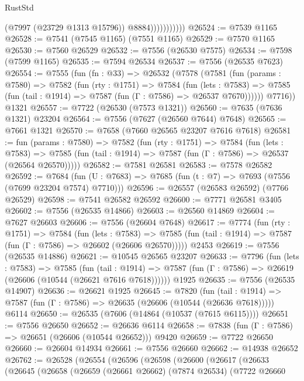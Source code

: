 \begin{lexlean}{RustStd}
\begin{coremodule}
{\begin{coremodule}
{{{{{{{{{{{{{{{{{{{{{{{{{{{{{{{{{{{{{{{{{{{                          (@7997 (@23729 @1313 @15796))
                          @8884)))))))))))
@26524 := @7539 @1165
@26528 := @7541 (@7545 @1165) (@7551 @1165)
@26529 := @7570 @1165
@26530 := @7560 @26529
@26532 := @7556 (@26530 @7575)
@26534 := @7598 (@7599 @1165)
@26535 := @7594 @26534
@26537 := @7556 (@26535 @7623)
@26554 := @7555
    (fun (fn : @33) =>
    @26532
      (@7578
        (@7581
          (fun (params : @7580) =>
          @7582
            (fun (rty : @1751) =>
            @7584
              (fun (lets : @7583) =>
              @7585 (fun (tail : @1914) => @7587 (fun (Γ : @7586) => @26537 @7670))))))
        @7716))
    @1321
@26557 := @7722 (@26530 (@7573 @1321))
@26560 := @7635 (@7636 @1321) @23204
@26564 := @7556 (@7627 (@26560 @7644) @7648)
@26565 := @7661 @1321
@26570 := @7658 (@7660 @26565 @23207 @7616 @7618)
@26581 := fun (params : @7580) =>
  @7582
    (fun (rty : @1751) =>
    @7584
      (fun (lets : @7583) =>
      @7585 (fun (tail : @1914) => @7587 (fun (Γ : @7586) => @26537 (@26564 @26570)))))
@26582 := @7581 @26581
@26583 := @7578 @26582
@26592 := @7684
    (fun (U : @7683) => @7685 (fun (t : @7) => @7693 (@7556 (@7699 @23204 @7574) @7710)))
@26596 := @26557 (@26583 @26592) (@7766 @26529)
@26598 := @7541 @26582 @26592
@26600 := @7771 @26581 @3405
@26602 := @7556 (@26535 @14866)
@26603 := @26560 @14869
@26604 := @7627 @26603
@26606 := @7556 (@26604 @7648)
@26617 := @7774
    (fun (rty : @1751) =>
    @7584
      (fun (lets : @7583) =>
      @7585 (fun (tail : @1914) => @7587 (fun (Γ : @7586) => @26602 (@26606 @26570)))))
    @2453
@26619 := @7556 (@26535 @14886)
@26621 := @10545 @26565 @23207
@26633 := @7796
    (fun (lets : @7583) =>
    @7585
      (fun (tail : @1914) =>
      @7587 (fun (Γ : @7586) => @26619 (@26606 (@10544 (@26621 @7616 @7618))))))
    @1925
@26635 := @7556 (@26535 @14907)
@26636 := @26621 @1925
@26645 := @7820
    (fun (tail : @1914) => @7587 (fun (Γ : @7586) => @26635 (@26606 (@10544 (@26636 @7618)))))
    @6114
@26650 := @26535 (@7606 (@14864 (@10537 (@7615 @6115))))
@26651 := @7556 @26650
@26652 := @26636 @6114
@26658 := @7838 (fun (Γ : @7586) => @26651 (@26606 (@10544 @26652))) @9420
@26659 := @7722 @26650
@26660 := @26604 @14934
@26661 := @7556 @26660
@26662 := @14938 @26652
@26762 := @26528
    (@26554
      (@26596
        (@26598
          (@26600
            (@26617
              (@26633
                (@26645
                  (@26658
                    (@26659
                      (@26661 @26662)
                      (@7874 @26534)
                      (@7722
                        @26660
}}}}}}}}}}}}}}}}}}}}}}}}}}}}}}}}}}}}}}}}}}}
\end{coremodule}}
\end{coremodule}
\end{lexlean}
